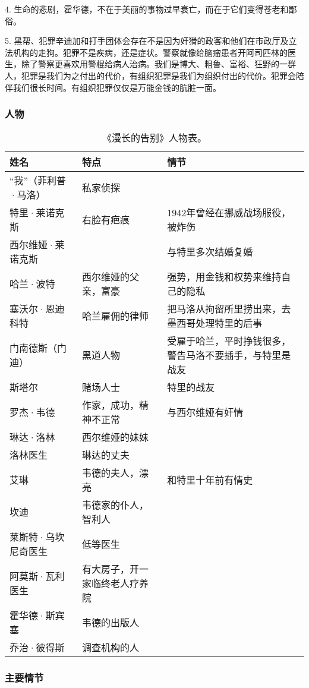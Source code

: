 4. 生命的悲剧，霍华德，不在于美丽的事物过早衰亡，而在于它们变得苍老和鄙俗。

5. 黑帮、犯罪辛迪加和打手团体会存在不是因为奸猾的政客和他们在市政厅及立法机构的走狗。犯罪不是疾病，还是症状。警察就像给脑瘤患者开阿司匹林的医生，除了警察更喜欢用警棍给病人治病。我们是博大、粗鲁、富裕、狂野的一群人，犯罪是我们为之付出的代价，有组织犯罪是我们为组织付出的代价。犯罪会陪伴我们很长时间。有组织犯罪仅仅是万能金钱的肮脏一面。

\subsubsection{人物}


\begin{longtable}{p{} | p{} | p{}}
\caption{《漫长的告别》人物表。}\\
姓名 & 特点 & 情节 \\
\hline
\endhead

\hline
\endfoot
“我”（菲利普·马洛） & 私家侦探 &  \\
特里·莱诺克斯 &右脸有疤痕 &1942年曾经在挪威战场服役，被炸伤 \\
西尔维娅·莱诺克斯 & &  与特里多次结婚复婚 \\
哈兰·波特 & 西尔维娅的父亲，富豪 &强势，用金钱和权势来维持自己的隐私 \\
塞沃尔·恩迪科特 & 哈兰雇佣的律师 & 把马洛从拘留所里捞出来，去墨西哥处理特里的后事 \\
门南德斯（门迪） & 黑道人物 & 受雇于哈兰，平时挣钱很多，警告马洛不要插手，与特里是战友 \\
斯塔尔 &赌场人士 & 特里的战友 \\
罗杰·韦德 & 作家，成功，精神不正常&与西尔维娅有奸情 \\
琳达·洛林 & 西尔维娅的妹妹 & \\
洛林医生 & 琳达的丈夫 & \\
艾琳 &韦德的夫人，漂亮 & 和特里十年前有情史 \\
坎迪 & 韦德家的仆人，智利人 & \\
莱斯特·乌坎尼奇医生 &低等医生  & \\
阿莫斯·瓦利医生 &有大房子，开一家临终老人疗养院 & \\
霍华德·斯宾塞 & 韦德的出版人 & \\
乔治·彼得斯 & 调查机构的人 & \\

\end{longtable}

\subsubsection{主要情节}

